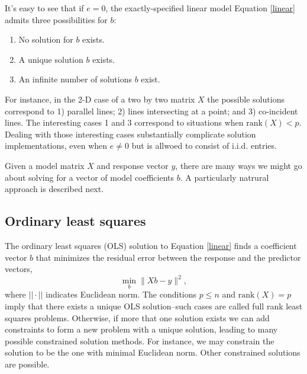 \documentclass[10pt]{article} %
\begin{document}
It's easy to see that if $e=0$, the exactly-specified linear model Equation
\ref{linear} admits three possibilities for $b$:
\begin{enumerate}\setlength\itemsep{-0.4em}
\item No solution for $b$ exists.
\item A unique solution $b$ exists.
\item An infinite number of solutions $b$ exist.
\end{enumerate}
For instance, in the 2-D case of a two by two matrix $X$ the possible solutions
correspond to 1) parallel lines; 2) lines intersecting at a point; and
3) co-incident lines.
The interesting cases 1 and 3 correspond to situations when
$\mathrm{rank}(X) < p$.
Dealing with those interesting cases substantially complicate
solution implementations, even when $e\ne 0$ but is allwoed to consist
of i.i.d. entries.

Given a model matrix $X$ and response vector $y$, there are many ways we might
go about solving for a vector of model coefficients $b$. A particularly
natrural approach is described next.


\subsection*{Ordinary least squares}

The ordinary least squares (OLS) solution to Equation \ref{linear} 
finds a coefficient vector $b$ that
minimizes the residual error between the response and the predictor
vectors,
\[
\min_b \|X b - y\|^2,
\]
where $||\cdot||$ indicates Euclidean norm.  The conditions $p \le n$ and
$\mathrm{rank}(X)=p$ imply that there exists a unique OLS solution--such cases
are called full rank least squares problems.  Otherwise, if more that one
solution exists we can add constraints to form a new problem with a unique
solution, leading to many possible constrained solution methods.
For instance, we may constrain the solution to be the one with minimal
Euclidean norm. Other constrained solutions are possible.
\end{document}
